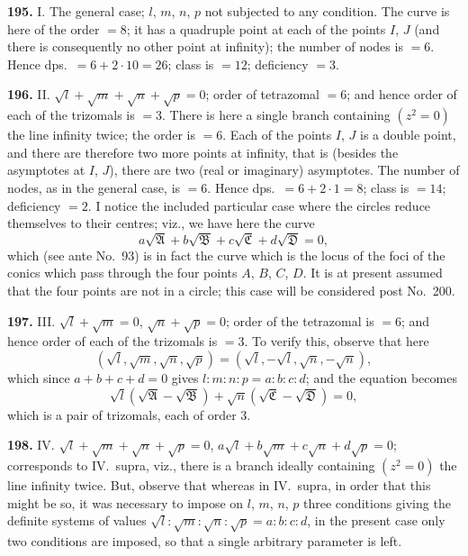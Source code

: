 \documentclass[12pt,a4paper]{article}
\theoremstyle{definition}
\begin{document}
\newpage
\noindent\textbf{195.} I. The general case; $l$, $m$, $n$, $p$ not subjected to any condition. The curve
is here of the order $= 8$; it has a quadruple point at each of the points $I$, $J$ (and
there is consequently no other point at infinity); the number of nodes is $= 6$. Hence
dps.\ $= 6 + 2 \cdot 10 = 26$; class is $= 12$; deficiency $= 3$.

\noindent\textbf{196.} II. $\sqrt{l} + \sqrt{m} + \sqrt{n} + \sqrt{p} = 0$; order of tetrazomal $= 6$; and hence
order of each of the trizomals is $= 3$. There is here a single branch containing
$(z^2 = 0)$ the line infinity twice; the order is $= 6$. Each of the points $I$, $J$ is a double
point, and there are therefore two more points at infinity, that is (besides the asymptotes
at $I$, $J$), there are two (real or imaginary) asymptotes. The number of nodes, as in
the general case, is $= 6$. Hence dps.\ $= 6 + 2 \cdot 1 = 8$; class is $= 14$; deficiency $= 2$.
I notice the included particular case where the circles reduce themselves to their
centres; viz., we have here the curve
\[
a\sqrt{\mathfrak{A}} + b\sqrt{\mathfrak{B}} + c\sqrt{\mathfrak{C}} + d\sqrt{\mathfrak{D}} = 0,
\]
which (see ante No.~93) is in fact the curve which is the locus of the foci of the
conics which pass through the four points $A$, $B$, $C$, $D$. It is at present assumed that
the four points are not in a circle; this case will be considered post No.~200.

\newpage
\noindent\textbf{197.} III. $\sqrt{l} + \sqrt{m} = 0$, $\sqrt{n} + \sqrt{p} = 0$; order of the tetrazomal is $= 6$; and
hence order of each of the trizomals is $= 3$. To verify this, observe that here
\[
(\sqrt{l}, \sqrt{m}, \sqrt{n}, \sqrt{p}) = (\sqrt{l}, -\sqrt{l}, \sqrt{n}, -\sqrt{n}),
\]
which since $a + b + c + d = 0$ gives $l : m : n : p = a : b : c : d$; and the equation becomes
\[
\sqrt{l}(\sqrt{\mathfrak{A}} - \sqrt{\mathfrak{B}}) + \sqrt{n}(\sqrt{\mathfrak{C}} - \sqrt{\mathfrak{D}}) = 0,
\]
which is a pair of trizomals, each of order $3$.

\noindent\textbf{198.} IV. $\sqrt{l} + \sqrt{m} + \sqrt{n} + \sqrt{p} = 0$, $a\sqrt{l} + b\sqrt{m} + c\sqrt{n} + d\sqrt{p} = 0$;
corresponds to IV.\ supra, viz., there is a branch ideally containing $(z^2 = 0)$ the line
infinity twice. But, observe that whereas in IV.\ supra, in order that this might be
so, it was necessary to impose on $l$, $m$, $n$, $p$ three conditions giving the definite
systems of values $\sqrt{l} : \sqrt{m} : \sqrt{n} : \sqrt{p} = a : b : c : d$, in the present case only two
conditions are imposed, so that a single arbitrary parameter is left.
\end{document}
